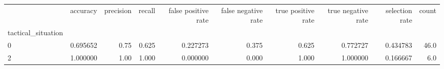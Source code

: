 \begin{tabular}{lrrrrrrrrr}
\toprule
{} &  accuracy &  precision &  recall &  false positive rate &  false negative rate &  true positive rate &  true negative rate &  selection rate &  count \\
tactical\_situation &           &            &         &                      &                      &                     &                     &                 &        \\
\midrule
0                  &  0.695652 &       0.75 &   0.625 &             0.227273 &                0.375 &               0.625 &            0.772727 &        0.434783 &   46.0 \\
2                  &  1.000000 &       1.00 &   1.000 &             0.000000 &                0.000 &               1.000 &            1.000000 &        0.166667 &    6.0 \\
\bottomrule
\end{tabular}
